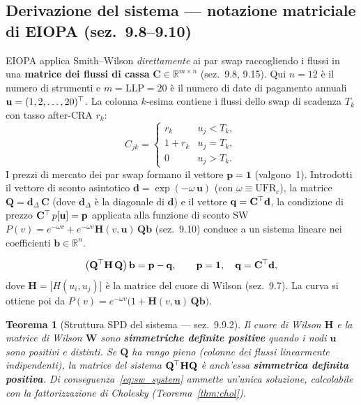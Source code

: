 \documentclass[11pt,a4paper]{article}
\theoremstyle{plain}
\newtheorem{teorema}{Teorema}[section]
\theoremstyle{definition}
\theoremstyle{remark}
\newcommand{\R}{\mathbb{R}}
\newcommand{\UFR}{\ensuremath{\mathrm{UFR}}}
\newcommand{\LLP}{\ensuremath{\mathrm{LLP}}}
\newcommand{\bfb}{\mathbf{b}}
\newcommand{\bfp}{\mathbf{p}}
\newcommand{\bfq}{\mathbf{q}}
\newcommand{\bfd}{\mathbf{d}}
\newcommand{\bfu}{\mathbf{u}}
\newcommand{\bfone}{\mathbf{1}}
\newcommand{\Wmat}{\mathbf{W}}
\newcommand{\Hmat}{\mathbf{H}}
\newcommand{\Cmat}{\mathbf{C}}
\newcommand{\Qmat}{\mathbf{Q}}
\newcommand{\transp}{^{\mskip-1mu\top}}
\begin{document}
\subsection{Derivazione del sistema --- notazione matriciale di EIOPA (sez.~9.8--9.10)}

EIOPA applica Smith--Wilson \emph{direttamente} ai par swap raccogliendo i flussi
in una \textbf{matrice dei flussi di cassa} $\Cmat\in\R^{m\times n}$ (sez.~9.8,
9.15). Qui $n=12$ è il numero di strumenti e $m=\LLP=20$ è il numero di date di
pagamento annuali $\bfu=(1,2,\ldots,20)\transp$. La colonna $k$-esima contiene i
flussi dello swap di scadenza $T_k$ con tasso after-CRA $r_k$:
\begin{equation}
  \label{eq:Cmat}
  C_{jk} = \begin{cases}
    r_k    & u_j < T_k,\\
    1 + r_k& u_j = T_k,\\
    0      & u_j > T_k.
  \end{cases}
\end{equation}
I prezzi di mercato dei par swap formano il vettore $\bfp=\bfone$ (valgono~1).
Introdotti il vettore di sconto asintotico $\bfd = \exp(-\omega\,\bfu)$
(con $\omega\equiv\UFR_c$), la matrice $\Qmat=\bfd_\Delta\,\Cmat$ (dove $\bfd_\Delta$
è la diagonale di $\bfd$) e il vettore $\bfq = \Cmat\transp\bfd$, la condizione di
prezzo $\Cmat\transp\,p[\bfu]=\bfp$ applicata alla funzione di sconto SW
$P(v)=e^{-\omega v}+e^{-\omega v}\Hmat(v,\bfu)\,\Qmat\bfb$ (sez.~9.10) conduce a un
sistema lineare nei coefficienti $\bfb\in\R^{n}$.

\begin{keybox}
\begin{equation}
  \label{eq:sw_system}
  \bigl(\Qmat\transp\Hmat\,\Qmat\bigr)\,\bfb = \bfp - \bfq,
  \qquad \bfp=\bfone,\quad \bfq=\Cmat\transp\bfd,
\end{equation}
dove $\Hmat=\bigl[H(u_i,u_j)\bigr]$ è la matrice del cuore di Wilson (sez.~9.7).
La curva si ottiene poi da $P(v)=e^{-\omega v}\bigl(1+\Hmat(v,\bfu)\,\Qmat\bfb\bigr)$.
\end{keybox}

\begin{teorema}[Struttura SPD del sistema --- sez.~9.9.2]
\label{thm:spd}
Il cuore di Wilson $\Hmat$ e la matrice di Wilson $\Wmat$ sono \textbf{simmetriche
definite positive} quando i nodi $\bfu$ sono positivi e distinti. Se $\Qmat$ ha
rango pieno (colonne dei flussi linearmente indipendenti), la matrice del sistema
$\Qmat\transp\Hmat\Qmat$ è anch'essa \textbf{simmetrica definita positiva}.
Di conseguenza~\eqref{eq:sw_system} ammette un'unica soluzione, calcolabile con la
fattorizzazione di Cholesky (Teorema~\ref{thm:chol}).
\end{teorema}
\end{document}
